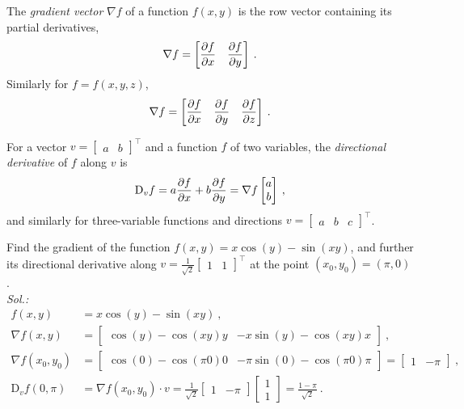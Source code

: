 \begin{definition}
	The \emph{gradient vector} $\nabla f$ of a function $f(x,y)$ is the row vector containing its partial derivatives,
	\[ \nabla f = \begin{bmatrix} \displaystyle{\frac{\partial f}{\partial x}} & \displaystyle{\frac{\partial f}{\partial y}} \end{bmatrix} \:. \]
	Similarly for $f=f(x,y,z)$,
	\[ \nabla f = \begin{bmatrix} \displaystyle{\frac{\partial f}{\partial x}} & \displaystyle{\frac{\partial f}{\partial y}} & \displaystyle{\frac{\partial f}{\partial z}} \end{bmatrix} \:. \]
\end{definition}

\begin{definition}
For a vector $v = \begin{bmatrix} a & b \end{bmatrix}^\top$ and a function $f$ of two variables, the \emph{directional derivative} of $f$ along $v$ is
\[ \mathrm{D}_v f = a \displaystyle{\frac{\partial f}{\partial x}} + b \displaystyle{\frac{\partial f}{\partial y}} 
= \nabla f \begin{bmatrix} a \\ b \end{bmatrix} \:, \]
and similarly for three-variable functions and directions $v = \begin{bmatrix} a & b & c \end{bmatrix}^\top$.
\end{definition}

\begin{example} Find the gradient of the function $f(x,y)=x\cos(y)-\sin(xy)$, and further its directional derivative along $v = \tfrac{1}{\sqrt{2}}\begin{bmatrix}
		1 & 1
	\end{bmatrix}^\top$ at the point $(x_0,y_0)=(\pi,0)$.\\
{\it Sol.:}
\begin{equation*}
\begin{split}
f(x,y) & = x\cos(y)-\sin(xy) \:, \\
\nabla f (x,y) & = 
\begin{bmatrix} \cos(y)-\cos(xy)y & -x\sin(y)-\cos(xy)x \end{bmatrix} \:, \\
\nabla f (x_0,y_0) & = 
\begin{bmatrix} \cos(0)-\cos(\pi 0)0 & -\pi\sin(0)-\cos(\pi 0) \pi \end{bmatrix}
= \begin{bmatrix} 1 & -\pi \end{bmatrix} \:, \\
\mathrm{D}_v f (0,\pi) & = \nabla f (x_0,y_0) \cdot v
= \frac{1}{\sqrt{2}}\begin{bmatrix} 1 & -\pi \end{bmatrix} 
\begin{bmatrix} 1 \\ 1 \end{bmatrix} = \frac{1-\pi}{\sqrt{2}} \:.
\end{split}
\end{equation*}
\end{example}

